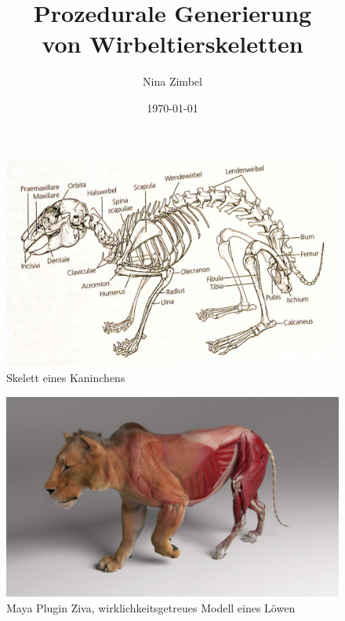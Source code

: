 \documentclass{beamer}
\title{Prozedurale Generierung\\ von Wirbeltierskeletten}
\author{Nina Zimbel}
\institute{KIT - Institut für Visualisierung und Datenanalyse}
\date{\today}
\begin{document}
\begin{frame}
 \maketitle
\end{frame}

\begin{frame}[focus]
 \begin{figure}
  \centering
  \includegraphics[width=\textwidth]{graphics/kaninchen.jpg}
  \caption{Skelett eines Kaninchens \cite{Spezielle_Zoologie}}
 \end{figure}
\end{frame}

\begin{frame}[focus]
 \begin{figure}
  \centering
  \includegraphics[width=\textwidth]{graphics/ziva-post2.jpg}
  \caption{Maya Plugin Ziva, wirklichkeitsgetreues Modell eines Löwen \cite{Ziva_Lion}}
 \end{figure}
\end{frame}
\end{document}
